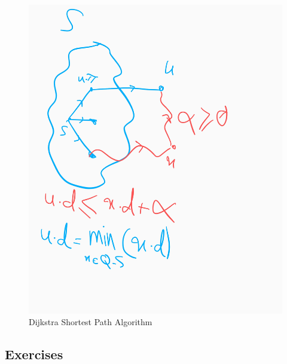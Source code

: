 \documentclass{book}
\begin{document}
	\begin{figure}
	\centering
	\caption{Dijkstra Shortest Path Algorithm}
	\label{fig:dijkstra-shortest-path-algorithm}
	\includegraphics[width=\linewidth]{images/dijkstra-shortest-path.jpg}
	\end{figure}
	\FloatBarrier
	\subsection{Exercises}
\end{document}

